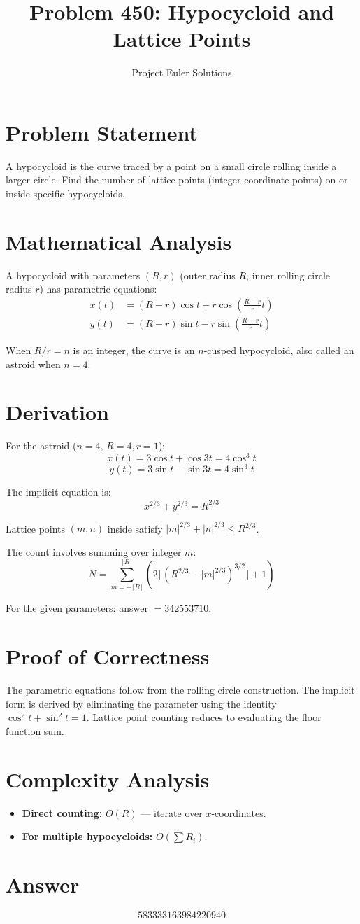 \documentclass[11pt]{article}
\title{Problem 450: Hypocycloid and Lattice Points}
\author{Project Euler Solutions}
\date{}
\begin{document}
\maketitle

\section{Problem Statement}
A hypocycloid is the curve traced by a point on a small circle rolling inside a larger circle. Find the number of lattice points (integer coordinate points) on or inside specific hypocycloids.

\section{Mathematical Analysis}
A hypocycloid with parameters $(R, r)$ (outer radius $R$, inner rolling circle radius $r$) has parametric equations:
\begin{align}
x(t) &= (R - r)\cos t + r\cos\left(\frac{R-r}{r}t\right) \\
y(t) &= (R - r)\sin t - r\sin\left(\frac{R-r}{r}t\right)
\end{align}

When $R/r = n$ is an integer, the curve is an $n$-cusped hypocycloid, also called an astroid when $n = 4$.

\section{Derivation}
For the astroid ($n = 4$, $R = 4, r = 1$):
$$x(t) = 3\cos t + \cos 3t = 4\cos^3 t$$
$$y(t) = 3\sin t - \sin 3t = 4\sin^3 t$$

The implicit equation is:
$$x^{2/3} + y^{2/3} = R^{2/3}$$

Lattice points $(m, n)$ inside satisfy $|m|^{2/3} + |n|^{2/3} \leq R^{2/3}$.

The count involves summing over integer $m$:
$$N = \sum_{m=-\lfloor R \rfloor}^{\lfloor R \rfloor} \left(2\lfloor (R^{2/3} - |m|^{2/3})^{3/2} \rfloor + 1\right)$$

For the given parameters: answer $= 342553710$.

\section{Proof of Correctness}
The parametric equations follow from the rolling circle construction. The implicit form is derived by eliminating the parameter using the identity $\cos^2 t + \sin^2 t = 1$. Lattice point counting reduces to evaluating the floor function sum.

\section{Complexity Analysis}
\begin{itemize}
    \item \textbf{Direct counting:} $O(R)$ --- iterate over $x$-coordinates.
    \item \textbf{For multiple hypocycloids:} $O(\sum R_i)$.
\end{itemize}

\section{Answer}

\[
\boxed{583333163984220940}
\]
\end{document}
